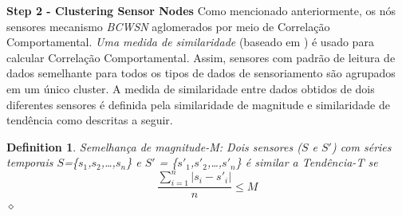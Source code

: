 \documentclass{acm_proc_article-sp}
\newcommand{\dia}{\hspace*{.1cm} \hfill $\diamond$}
\begin{document}
{\bf Step 2 - Clustering Sensor Nodes}
Como mencionado anteriormente, os nós sensores mecanismo {\it BCWSN} aglomerados
por meio de Correlação Comportamental. \textit{Uma medida de similaridade} 
(baseado em \cite{Liu2007}) é usado para calcular Correlação Comportamental. 
Assim, sensores com padrão de leitura de dados semelhante para todos os 
tipos de dados de sensoriamento são agrupados em um único cluster. 
A medida de similaridade entre dados obtidos de dois diferentes sensores 
é definida pela similaridade de magnitude e similaridade de tendência como
descritas a seguir.
\vspace*{-.3cm}

\newtheorem{defini}{Definition}

\begin{defini}
Semelhança de magnitude-M: Dois sensores ($S$ e $S'$) com séries temporais
$S$=\{$s_{1}$,$s_{2}$,\ldots,$s_{n}$\} e
$S'$ = \{$s'_{1}$,$s'_{2}$,\ldots,$s'_{n}$\} é similar a Tendência-T se 
\begin{equation}
\label{equ:magni}
\frac{\sum_{i=1}^{n} |s_{i}-s'_{i}|}{n} \leq M
\end{equation}
\dia
\end{defini}
\vspace*{-.9cm}
\end{document}
